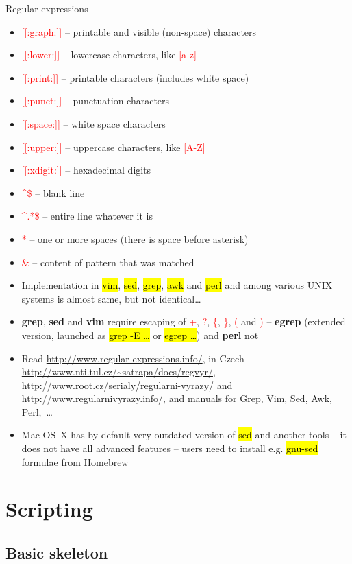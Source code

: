 \documentclass[compress, ucs, xelatex, 11pt, xcolor=svgnames,
  hyperref={
    bookmarks=true,
    unicode=true,
    colorlinks=true,
    pdftitle={Linux, command line and MetaCentrum},
    plainpages=false,
    pdfauthor={Vojtech Zeisek},
    pdfsubject={Course about use of Linux command line, writing shell scripts and using MetaCentrum of CESNET},
    pdfcreator={XeLaTeX},
    pdfkeywords={Linux, GNU, BASH, shell, command line, MetaCentrum},
    linkcolor=DarkRed,
    anchorcolor=DarkBlue,
    citecolor=Indigo,
    filecolor=NavyBlue,
    menucolor=DarkMagenta,
    urlcolor=DarkBlue,
    pdftex},
  url={hyphens, lowtilde} %
  ]{beamer}
\renewcommand{\texttt}[1]{\hl{\ttfamily #1}}
\renewcommand{\alert}[1]{\textcolor{red}{#1}}
\begin{document}
\begin{frame}[allowframebreaks]{Regular expressions}
\begin{itemize}
  \item \alert{[[:graph:]]} -- printable and visible (non-space) characters
  \item \alert{[[:lower:]]} -- lowercase characters, like \alert{[a-z]}
  \item \alert{[[:print:]]} -- printable characters (includes white space)
  \item \alert{[[:punct:]]} -- punctuation characters
  \item \alert{[[:space:]]} -- white space characters
  \item \alert{[[:upper:]]} -- uppercase characters, like \alert{[A-Z]}
  \item \alert{[[:xdigit:]]} -- hexadecimal digits
  \item \alert{\textasciicircum\$} -- blank line
  \item \alert{\textasciicircum.*\$} -- entire line whatever it is
  \item \alert{ *} -- one or more spaces (there is space before asterisk)
  \item \alert{\&} -- content of pattern that was matched
  \item Implementation in \texttt{vim}, \texttt{sed}, \texttt{grep}, \texttt{awk} and \texttt{perl} and among various UNIX systems is almost same, but not identical\ldots
  \item \textbf{grep}, \textbf{sed} and \textbf{vim} require escaping of \alert{+}, \alert{?}, \alert{\{}, \alert{\}}, \alert{(} and \alert{)} -- \textbf{egrep} (extended version, launched as \texttt{grep -E \ldots} or \texttt{egrep \ldots}) and \textbf{perl} not
  \item Read \url{http://www.regular-expressions.info/}, in Czech \url{http://www.nti.tul.cz/~satrapa/docs/regvyr/}, \url{http://www.root.cz/serialy/regularni-vyrazy/} and \url{http://www.regularnivyrazy.info/}, and manuals for Grep, Vim, Sed, Awk, Perl,~\ldots
  \item Mac OS~X has by default very outdated version of \texttt{sed} and another tools -- it does not have all advanced features -- users need to install e.g. \texttt{gnu-sed} formulae from \href{http://brew.sh/}{Homebrew}
\end{itemize}
\end{frame}

\section{Scripting}

\subsection{Basic skeleton}
\end{document}
